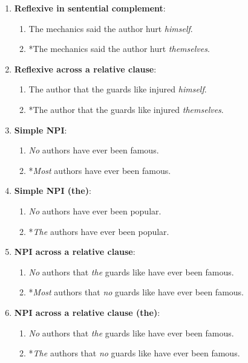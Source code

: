 \begin{enumerate}[noitemsep]
\begin{enumerate}
    \end{enumerate}
  \item \textbf{Reflexive in sentential complement}:
    \begin{enumerate}
      \item The mechanics said the author hurt \textit{himself}.
      \item *The mechanics said the author hurt \textit{themselves}.
    \end{enumerate}
  \item \textbf{Reflexive across a relative clause}:
    \begin{enumerate}
      \item The author that the guards like injured \textit{himself}.
      \item *The author that the guards like injured \textit{themselves}.
    \end{enumerate}
  \item \textbf{Simple NPI}:
    \begin{enumerate}
      \item \textit{No} authors have ever been famous.
      \item *\textit{Most} authors have ever been famous.
    \end{enumerate}
  \item \textbf{Simple NPI (the)}:
    \begin{enumerate}
      \item \textit{No} authors have ever been popular.
      \item *\textit{The} authors have ever been popular.
    \end{enumerate}
  \item \textbf{NPI across a relative clause}:
    \begin{enumerate}
      \item \textit{No} authors that \textit{the} guards like have ever been famous.
      \item *\textit{Most} authors that \textit{no} guards like have ever been famous.
    \end{enumerate}
  \item \textbf{NPI across a relative clause (the)}:
    \begin{enumerate}
      \item \textit{No} authors that \textit{the} guards like have ever been famous.
      \item *\textit{The} authors that \textit{no} guards like have ever been famous.
    \end{enumerate}
\end{enumerate}




